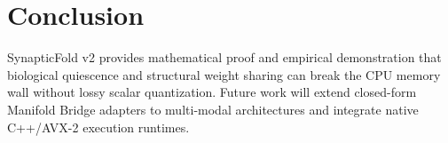 \documentclass[10pt,journal,compsoc]{IEEEtran}
\theoremstyle{definition}
\begin{document}
\section{Conclusion}
SynapticFold v2 provides mathematical proof and empirical demonstration that biological quiescence and structural weight sharing can break the CPU memory wall without lossy scalar quantization. Future work will extend closed-form Manifold Bridge adapters to multi-modal architectures and integrate native C++/AVX-2 execution runtimes.
\end{document}
